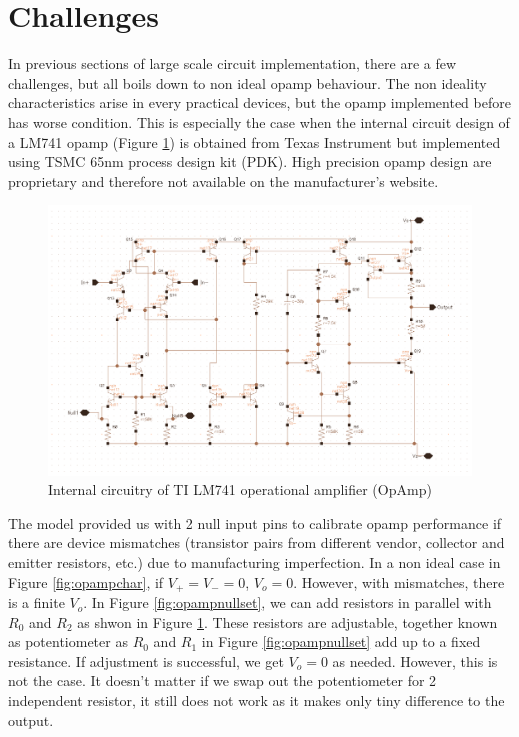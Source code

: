 \section{Challenges}
In previous sections of large scale circuit implementation, there are a few challenges, but all boils down to non ideal opamp behaviour. The non ideality characteristics arise in every practical devices, but the opamp implemented before has worse condition. This is especially the case when the internal circuit design of a LM741 opamp (Figure \ref{fig:opampint}) is obtained from Texas Instrument but implemented using TSMC 65nm process design kit (PDK). High precision opamp design are proprietary and therefore not available on the manufacturer's website.
\label{sect:cha}
\begin{figure}[h]
	\centering
	\includegraphics[scale=0.35]{opamp.png}
	\caption{Internal circuitry of TI LM741 operational amplifier (OpAmp)}
	\label{fig:opampint}
\end{figure}
The model provided us with 2 null input pins to calibrate opamp performance if there are device mismatches (transistor pairs from different vendor, collector and emitter resistors, etc.) due to manufacturing imperfection. In a non ideal case in Figure \ref{fig:opampchar}, if $V_+ = V_- = 0$, $V_o = 0$. However, with mismatches, there is a finite $V_o$. In Figure \ref{fig:opampnullset}, we can add resistors in parallel with $R_0$ and $R_2$ as shwon in Figure \ref{fig:opampint}. These resistors are adjustable, together known as potentiometer as $R_0$ and $R_1$ in Figure \ref{fig:opampnullset} add up to a fixed resistance. If adjustment is successful, we get $V_o = 0$ as needed. However, this is not the case. It doesn't matter if we swap out the potentiometer for 2 independent resistor, it still does not work as it makes only tiny difference to the output.
